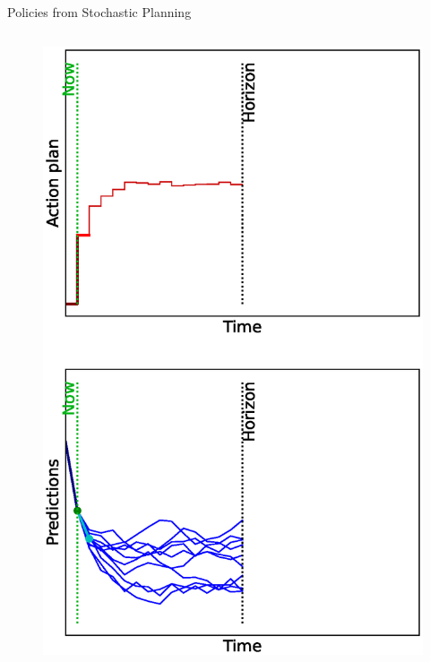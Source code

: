 \documentclass[lecture]{beamer}
\begin{document}
\begin{frame}{\normalsize Policies from Stochastic Planning}
\begin{columns}
\begin{overlayarea}{\textwidth}{0.9\textheight}
\begin{figure}
{          \includegraphics[width=\FS\textwidth,clip]{Codes/MPC/MPCMC1.eps}
        }%
        {%
}
\end{figure}
\end{overlayarea}
\end{columns}
\end{frame}
\end{document}
